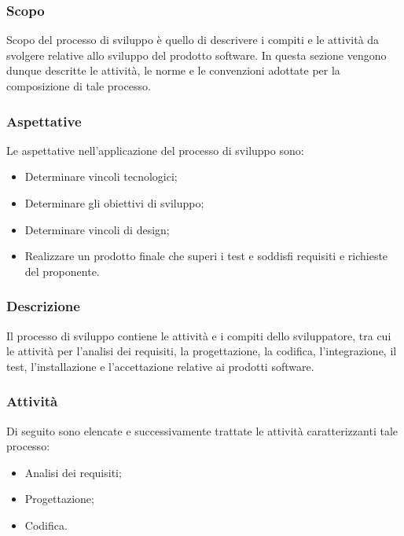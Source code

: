     \subsubsection{Scopo} \label{subsubsection:Sviluppo_Scopo}
    Scopo del processo di sviluppo è quello di descrivere i compiti e le attività da svolgere relative allo sviluppo del prodotto software.
    In questa sezione vengono dunque descritte le attività, le norme e le convenzioni adottate per la composizione di tale processo.

    \subsubsection{Aspettative} \label{subsubsection:Sviluppo_Aspettative}
    Le aspettative nell’applicazione del processo di sviluppo sono:
    \begin{itemize}
        \item Determinare vincoli tecnologici;
        \item Determinare gli obiettivi di sviluppo;
        \item Determinare vincoli di design;
        \item Realizzare un prodotto finale che superi i test e soddisfi requisiti e richieste del proponente.
    \end{itemize}

    \subsubsection{Descrizione} \label{subsubsection:Sviluppo_Descrizione}
    Il processo di sviluppo contiene le attività e i compiti dello sviluppatore, tra cui le attività per l’analisi dei requisiti, la progettazione, 
    la codifica, l’integrazione, il test, l’installazione e l’accettazione relative ai prodotti software.

    \subsubsection{Attività} \label{subsubsection:Attivita'}
    Di seguito sono elencate e successivamente trattate le attività caratterizzanti tale processo:
    \begin{itemize}
        \item Analisi dei requisiti;
        \item Progettazione;
        \item Codifica.
    \end{itemize}
    
